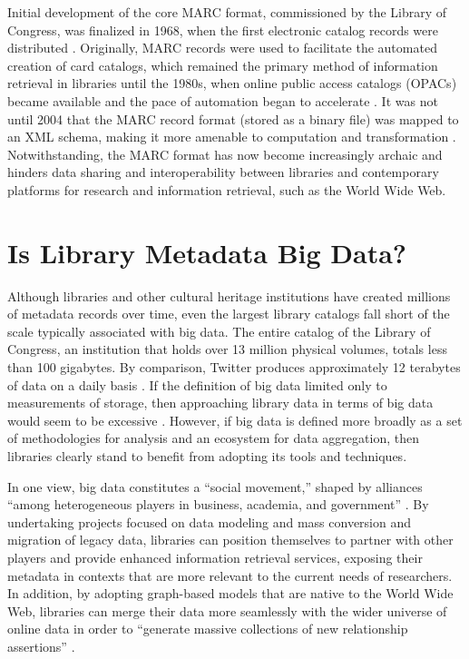 \documentclass[sigconf]{acmart}
\begin{document}
Initial development of the core MARC format, commissioned by the Library of Congress, was finalized in 1968, when the first electronic catalog records were distributed \cite{kF12}. Originally, MARC records were used to facilitate the automated creation of card catalogs, which remained the primary method of information retrieval in libraries until the 1980s, when online public access catalogs (OPACs) became available and the pace of automation began to accelerate \cite{mT13}. It was not until 2004 that the MARC record format (stored as a binary file) was mapped to an XML schema, making it more amenable to computation and transformation \cite{mX04}. Notwithstanding, the MARC format has now become increasingly archaic and hinders data sharing and interoperability between libraries and contemporary platforms for research and information retrieval, such as the World Wide Web.

\section{Is Library Metadata Big Data?}
Although libraries and other cultural heritage institutions have created millions of metadata records over time, even the largest library catalogs fall short of the scale typically associated with big data. The entire catalog of the Library of Congress, an institution that holds over 13 million physical volumes, totals less than 100 gigabytes. By comparison, Twitter produces approximately 12 terabytes of data on a daily basis \cite[p.~1527]{hE15}. If the definition of big data limited only to measurements of storage, then approaching library data in terms of big data would seem to be excessive \cite{mT13}. However, if big data is defined more broadly as a set of methodologies for analysis and an ecosystem for data aggregation, then libraries clearly stand to benefit from adopting its tools and techniques. 

In one view, big data constitutes a ``social movement,'' shaped by alliances ``among heterogeneous players in business, academia, and government'' \cite[p.~1527]{hE15}. By undertaking projects focused on data modeling and mass conversion and migration of legacy data, libraries can position themselves to partner with other players and provide enhanced information retrieval services, exposing their metadata in contexts that are more relevant to the current needs of researchers. In addition, by adopting graph-based models that are native to the World Wide Web, libraries can merge their data more seamlessly with the wider universe of online data in order to ``generate massive collections of new relationship assertions'' \cite{mT13}. 
\end{document}
